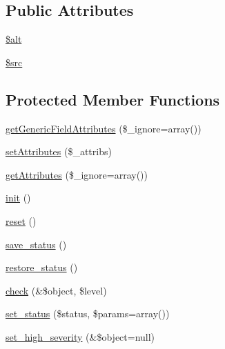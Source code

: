 \subsection*{Public Attributes}
\begin{DoxyCompactItemize}
\item 
\hyperlink{classFormFieldButtonPlugin_ad508b2eca248b109cb6409abdf00ffb5}{\$alt}
\item 
\hyperlink{classFormFieldButtonPlugin_a33519a89924287c0b7628a006438cac2}{\$src}
\end{DoxyCompactItemize}
\subsection*{Protected Member Functions}
\begin{DoxyCompactItemize}
\item 
\hyperlink{classFormFieldPlugin_a8a2959e90a3a20d0bb1bcbfafafc70b0}{getGenericFieldAttributes} (\$\_\-ignore=array())
\item 
\hyperlink{classBaseElement_aa623b042d23a5b77add8b3c452ec5855}{setAttributes} (\$\_\-attribs)
\item 
\hyperlink{classBaseElement_ae8237038633fc53db818f36da1940297}{getAttributes} (\$\_\-ignore=array())
\item 
\hyperlink{class__OWL_ae0ef3ded56e8a6b34b6461e5a721cd3e}{init} ()
\item 
\hyperlink{class__OWL_a2f2a042bcf31965194c03033df0edc9b}{reset} ()
\item 
\hyperlink{class__OWL_a9e49b9c76fbc021b244c6915ea536d71}{save\_\-status} ()
\item 
\hyperlink{class__OWL_a465eeaf40edd9f9c848841700c32ce55}{restore\_\-status} ()
\item 
\hyperlink{class__OWL_ad6f4f6946f40199dd0333cf219fa500e}{check} (\&\$object, \$level)
\item 
\hyperlink{class__OWL_aea912d0ede9b3c2a69b79072d94d4787}{set\_\-status} (\$status, \$params=array())
\item 
\hyperlink{class__OWL_a576829692a3b66e3d518853bf43abae3}{set\_\-high\_\-severity} (\&\$object=null)
\end{DoxyCompactItemize}
